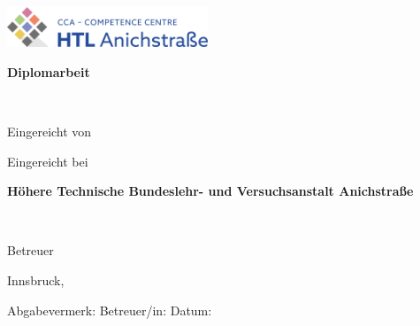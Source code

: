 
\newcommand{\myworktitle}{Diplomarbeit}  %
\newcommand{\myuniversity}{Höhere Technische Bundeslehr- und Versuchsanstalt Anichstraße} %
\newcommand{\mysubmissiontown}{Innsbruck}

\begin{titlepage}

{\sffamily

\begin{center}


\includegraphics[width=60mm]{figures/htl-logo}

\vfill\vfill\vfill
\vspace{1cm}
{\LARGE\bfseries\myworktitle}

\vfill\vfill\vfill

{\Large\bfseries\mytitle} \\
\mysubtitle

\vfill\vfill\vfill
\vfill\vfill\vfill



\vfill\vfill\vfill

\vspace{1cm}
Eingereicht von

{\bfseries\large\myauthor}
\vfill\vfill\vfill

\vspace{0.5cm}
Eingereicht bei

\vfill

{\bfseries\large\myuniversity}
\vfill

\myinstitute\\

\vfill\vfill\vfill

\vspace{0.5cm}
Betreuer

\mysupervisor

\vfill\vfill\vfill\vfill

\mysubmissiontown, \mysubmissionmonth~\mysubmissionyear

\vspace{0.5cm}
\hrulefill

\begin{flushleft}
	

\vfill\vfill
Abgabevermerk:    \hspace{5cm} 					Betreuer/in:
\vfill\vfill
Datum:       
\end{flushleft}
\end{center}
}%
\end{titlepage}
